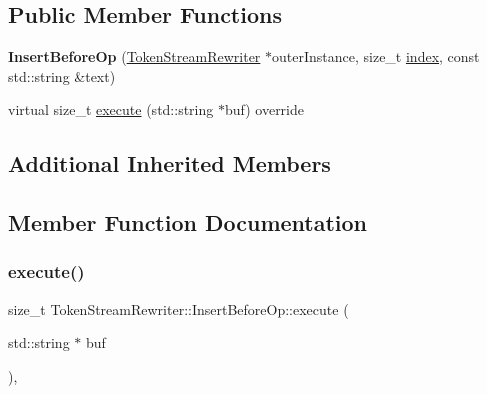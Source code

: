 \subsection*{Public Member Functions}
\begin{DoxyCompactItemize}
\item 
\mbox{\label{classantlr4_1_1TokenStreamRewriter_1_1InsertBeforeOp_ab7a19298a7a9f5c334d8dbe92bd21142}} 
{\bfseries Insert\+Before\+Op} (\hyperlink{classantlr4_1_1TokenStreamRewriter}{Token\+Stream\+Rewriter} $\ast$outer\+Instance, size\+\_\+t \hyperlink{classantlr4_1_1TokenStreamRewriter_1_1RewriteOperation_a1d3d3c3b22f030f300b3fd7c41a5ec47}{index}, const std\+::string \&text)
\item 
virtual size\+\_\+t \hyperlink{classantlr4_1_1TokenStreamRewriter_1_1InsertBeforeOp_a3370a856de310970f4448c0aff90244e}{execute} (std\+::string $\ast$buf) override
\end{DoxyCompactItemize}
\subsection*{Additional Inherited Members}


\subsection{Member Function Documentation}
\mbox{\label{classantlr4_1_1TokenStreamRewriter_1_1InsertBeforeOp_a3370a856de310970f4448c0aff90244e}} 
\subsubsection{\texorpdfstring{execute()}{execute()}}
{\footnotesize\ttfamily size\+\_\+t Token\+Stream\+Rewriter\+::\+Insert\+Before\+Op\+::execute (\begin{DoxyParamCaption}\item[{std\+::string $\ast$}]{buf }\end{DoxyParamCaption})\hspace{0.3cm}{\ttfamily [override]}, {\ttfamily [virtual]}}

